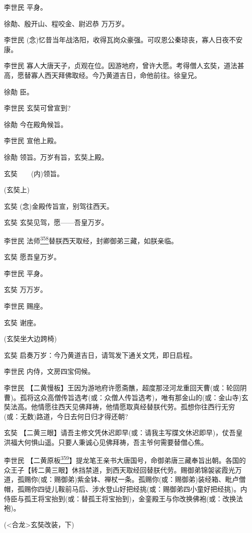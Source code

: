 李世民 平身。

徐勣、殷开山、程咬金、尉迟恭 万万岁。

李世民
(念)忆昔当年战洛阳，收得瓦岗众豪强。可叹恩公秦琼丧，寡人日夜不安康。

李世民
寡人大唐天子，贞观在位。因游地府，曾许大愿。考得僧人玄奘，道法甚高，愿替寡人西天拜佛取经。今乃黄道吉日，命他前往。徐皇兄。

徐勣 臣。

李世民 玄奘可曾宣到?

徐勣 今在殿角候旨。

李世民 宣他上殿。

徐勣 领旨。万岁有旨，玄奘上殿。

玄奘　　(内)领旨。

(玄奘上)

玄奘 (念)金殿传旨宣，别驾往西天。

玄奘 玄奘见驾，愿------吾皇万岁。

李世民
法师\protect\hyperlink{fn358}{\textsuperscript{358}}替朕西天取经，封卿御弟三藏，如朕亲临。

玄奘 愿吾皇万岁。

李世民 平身。

玄奘 万万岁。

李世民 赐座。

玄奘 谢座。

(玄奘坐大边跨椅)

玄奘 启奏万岁：今乃黄道吉日，请驾发下通关文凭，即日启程。

李世民 内侍，文房四宝伺候。

李世民
【二黄慢板】王因为游地府许愿斋醮，超度那泾河龙重回天曹(或：轮回阴曹)。孤将这众高僧传旨选考(或：众僧人传旨选考)，唯有那金山的(或：金山寺)玄奘法高。他情愿往西天见佛拜祷，他情愿取真经替朕代劳。孤想你往西行无穷(或：无数)路道，今日去何日归才得还朝?

玄奘
【二黄三眼】请吾主修文凭休迟即早(或：请我主写牒文休迟即早)，仗吾皇洪福大何惧山遥。只要人秉诚心见佛拜祷，吾主爷何需要替僧心焦。

李世民
【二黄原板\protect\hyperlink{fn359}{\textsuperscript{359}}】提龙笔王亲书大唐国号，命御弟唐三藏奉旨出朝。各国的众王子【转二黄三眼】休挡禁道，到西天取经回替朕代劳。赐御弟锦袈裟霞光万道，孤赐你(或：赐御弟)紫金钵、禅杖一条。孤赐你(或：赐御弟)装经箱、毗卢僧帽，孤赐你四徒儿鞍前马后、涉水登山好把经挑(或：赐御弟四小童好把经挑)。内侍臣与孤王将宝抬到(或：替孤王将宝抬到)，金銮殿王与你改换佛袍(或：改换法袍)。

(\textless{}合龙\textgreater{}玄奘改装，下)


